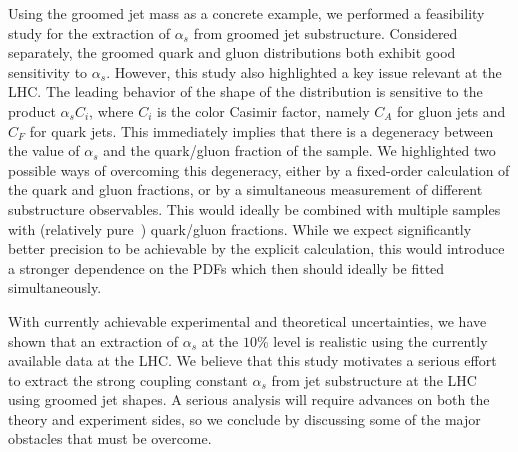 \documentclass[11pt]{cernrep}
\begin{document}
Using the groomed jet mass as a concrete example, we performed a feasibility study for the extraction of $\alpha_s$ from groomed jet substructure.
%
Considered separately, the groomed quark and gluon distributions both exhibit good sensitivity to $\alpha_s$.
%
However, this study also highlighted a key issue relevant at the LHC.
%
The leading behavior of the shape of the distribution is sensitive to the product $\alpha_s C_i$, where $C_i$ is the color Casimir factor, namely $C_A$ for gluon jets and $C_F$ for quark jets.
%
This immediately implies that there is a degeneracy between the value of $\alpha_s$ and the quark/gluon fraction of the sample.
%
We highlighted two possible ways of overcoming this degeneracy, either by a fixed-order calculation of the quark and gluon fractions, or by a simultaneous measurement of different substructure observables.
%
This would ideally be combined with multiple samples with (relatively pure~\cite{Gallicchio:2011xc}) quark/gluon fractions.
%
While we expect significantly better precision to be achievable by the explicit calculation, this would introduce a stronger dependence on the PDFs which then should ideally be fitted simultaneously.

With currently achievable experimental and theoretical uncertainties, we have shown that an extraction of $\alpha_s$ at the $10\%$ level is realistic using the currently available data at the LHC.
%
We believe that this study motivates a serious effort to extract the strong coupling constant $\alpha_s$ from jet substructure at the LHC using groomed jet shapes.
%
A serious analysis will require advances on both the theory and experiment sides, so we conclude by discussing some of the major obstacles that must be overcome.
\end{document}
